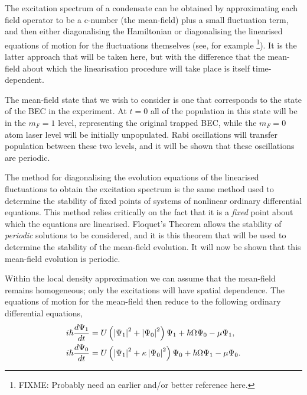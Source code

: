 The excitation spectrum of a condensate can be obtained by approximating each field operator to be a c-number (the mean-field) plus a small fluctuation term, and then either diagonalising the Hamiltonian \cite{Bogoliubov:1947,FetterWalecka} or diagonalising the linearised equations of motion for the fluctuations themselves (see, for example \cite{Ho:1998}\footnote{FIXME: Probably need an earlier and/or better reference here.}). It is the latter approach that will be taken here, but with the difference that the mean-field about which the linearisation procedure will take place is itself time-dependent.

The mean-field state that we wish to consider is one that corresponds to the state of the BEC in the experiment. At $t=0$ all of the population in this state will be in the $m_F=1$ level, representing the original trapped BEC, while the $m_F=0$ atom laser level will be initially unpopulated. Rabi oscillations will transfer population between these two levels, and it will be shown that these oscillations are periodic.

The method for diagonalising the evolution equations of the linearised fluctuations to obtain the excitation spectrum is the same method used to determine the stability of fixed points of systems of nonlinear ordinary differential equations. This method relies critically on the fact that it is a \emph{fixed} point about which the equations are linearised. Floquet's Theorem \citep{Nayfeh:1995} allows the stability of \emph{periodic} solutions to be considered, and it is this theorem that will be used to determine the stability of the mean-field evolution. It will now be shown that this mean-field evolution is periodic.

Within the local density approximation we can assume that the mean-field remains homogeneous; only the excitations will have spatial dependence. The equations of motion for the mean-field then reduce to the following ordinary differential equations,
\begin{subequations}
    \label{Peaks:MeanFieldEquationsOfMotion}
    \begin{align}
    i \hbar \frac{d \Psi_1}{dt} &= U\left(\abs{\Psi_1}^2 + \abs{\Psi_0}^2\right)\Psi_1 + \hbar \Omega \Psi_0 - \mu \Psi_1,\\
    i \hbar \frac{d \Psi_0}{dt} &= U\left(\abs{\Psi_1}^2 + \kappa \abs{\Psi_0}^2\right)\Psi_0 + \hbar \Omega \Psi_1 - \mu \Psi_0.
    \end{align}
\end{subequations}

